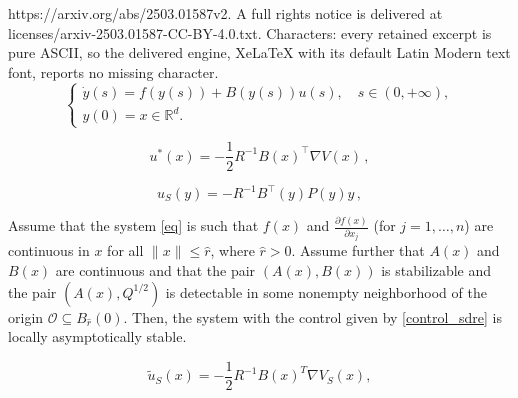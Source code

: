 \documentclass[10pt,a4paper]{amsart}
\begin{document}
https://arxiv.org/abs/2503.01587v2. A full rights notice is delivered at licenses/arxiv-2503.01587-CC-BY-4.0.txt. Characters: every retained excerpt is pure ASCII, so the delivered engine, XeLaTeX with its default Latin Modern text font, reports no missing character.
\begin{equation}\label{eq}
\left\{ \begin{array}{l}
\dot{y}(s) = f(y(s)) + B(y(s)) u(s), \quad s \in (0, +\infty),\\
y(0) = x \in \mathbb{R}^d.
\end{array} \right.
\end{equation}  

\begin{equation}\label{optc}
u^*(x) = -\frac{1}{2} R^{-1} B(x)^{\top} \nabla V(x)\,,
\end{equation}  

\begin{equation}
	u_S(y) = -R^{-1} B^{\top}(y) P(y)y\,,
	\label{control_sdre}
\end{equation}

\begin{theorem}
    Assume that the system \eqref{eq} is such that \( f(x) \) and \( \frac{\partial f(x)}{\partial x_j} \) (for \( j = 1, \dots, n \)) are continuous in \( x \) for all \( \|x\| \leq \hat{r} \), where \( \hat{r} > 0 \).
Assume further that \( A(x) \) and \( B(x) \) are continuous and that the pair $(A(x),B(x))$ is stabilizable and the pair $(A(x),Q^{1/2})$ is detectable in some nonempty neighborhood of the origin \( \mathcal{O} \subseteq B_{\hat{r}}(0) \). Then, the system with the control given by \eqref{control_sdre} is locally asymptotically stable.
\label{thm:stable}
\end{theorem}

\begin{equation}
\tilde{u}_{S}(x) = -\frac{1}{2} R^{-1} B(x)^T \nabla V_S (x),
\label{utilde_sdre}
\end{equation}
\end{document}
